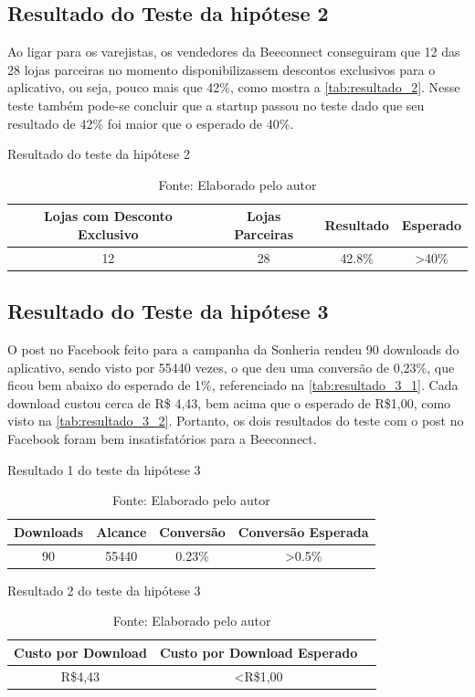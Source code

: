 \subsection{Resultado do Teste da hipótese 2}
\label{cha:resultado_2}
Ao ligar para os varejistas, os vendedores da Beeconnect conseguiram que 12 das 28 lojas parceiras no momento disponibilizassem descontos exclusivos para o aplicativo, ou seja, pouco mais que 42\%, como mostra a \autoref{tab:resultado_2}. Nesse teste também pode-se concluir que a startup passou no teste dado que seu resultado de 42\% foi maior que o esperado de 40\%.
\begin{table}[H]
\centering
\caption{Resultado do teste da hipótese 2}
\label{tab:resultado_2}
\begin{tabular}{|c|c|c|c|}
\hline
Lojas com Desconto Exclusivo & Lojas Parceiras & Resultado   & Esperado          \\ \hline
12                       	  & 28              & 42.8\%      & \textgreater 40\% \\ \hline
\end{tabular}
\caption* {Fonte: Elaborado pelo autor}    
\end{table}

\subsection{Resultado do Teste da hipótese 3}
\label{cha:resultado_3}
O post no Facebook feito para a campanha da Sonheria rendeu 90 downloads do aplicativo, sendo visto por 55440 vezes, o que deu uma conversão de 0,23\%, que ficou bem abaixo do esperado de 1\%, referenciado na \autoref{tab:resultado_3_1}. Cada download custou cerca de R\$ 4,43, bem acima que o esperado de R\$1,00, como visto na \autoref{tab:resultado_3_2}. Portanto, os dois resultados do teste com o post no Facebook foram bem insatisfatórios para a Beeconnect.
\begin{table}[H]
\centering
\caption{Resultado 1 do teste da hipótese 3}
\label{tab:resultado_3_1}
\begin{tabular}{|c|c|c|c|}
\hline
Downloads & Alcance & Conversão & Conversão Esperada \\ \hline
90                       & 55440 &  0.23\%     & \textgreater 0.5\% \\ \hline
\end{tabular}
\caption* {Fonte: Elaborado pelo autor}    
\end{table}

\begin{table}[H]
\centering
\caption{Resultado 2 do teste da hipótese 3}
\label{tab:resultado_3_2}
\begin{tabular}{|c|c|c|}
\hline
Custo por Download & Custo por Download Esperado \\ \hline
R\$4,43          & \textless R\$1,00 \\ \hline
\end{tabular}
\caption* {Fonte: Elaborado pelo autor}    
\end{table}


